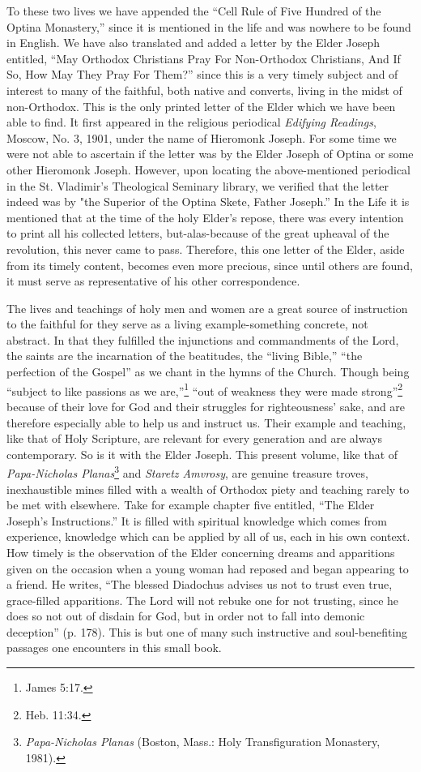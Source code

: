 To these two lives we have appended the “Cell Rule of Five Hundred of the Optina Monastery,” since it is mentioned in the life and was nowhere to be found in English. We have also translated and added a letter by the Elder Joseph entitled, “May Orthodox Christians Pray For Non-Orthodox Christians, And If So, How May They Pray For Them?” since this is a very timely subject and of interest to many of the faithful, both native and converts, living in the midst of non-Orthodox. This is the only printed letter of the Elder which we have been able to find. It first appeared in the religious periodical \textit{Edifying Readings}, Moscow, No. 3, 1901, under the name of Hieromonk Joseph. For some time we were not able to ascertain if the letter was by the Elder Joseph of Optina or some other Hieromonk Joseph. However, upon locating the above-mentioned periodical in the St. Vladimir's Theological Seminary library, we verified that the letter indeed was by "the Superior of the Optina Skete, Father Joseph.” In the Life it is mentioned that at the time of the holy Elder's repose, there was every intention to print all his collected letters, but-alas-because of the great upheaval of the revolution, this never came to pass. Therefore, this one letter of the Elder, aside from its timely content, becomes even more precious, since until others are found, it must serve as representative of his other correspondence.

The lives and teachings of holy men and women are a great source of instruction to the faithful for they serve as a living example-something concrete, not abstract. In that they fulfilled the injunctions and commandments of the Lord, the saints are the incarnation of the beatitudes, the “living Bible,” “the perfection of the Gospel” as we chant in the hymns of the Church. Though being “subject to like passions as we are,''\footnote{James 5:17.} “out of weakness they were made strong''\footnote{Heb. 11:34.} because of their love for God and their struggles for righteousness' sake, and are therefore especially able to help us and instruct us. Their example and teaching, like that of Holy Scripture, are relevant for every generation and are always contemporary. So is it with the Elder Joseph. This present volume, like that of \textit{Papa-Nicholas Planas}\footnote{\textit{Papa-Nicholas Planas} (Boston, Mass.: Holy Transfiguration Monastery, 1981).} and \textit{Staretz Amvrosy}, are genuine treasure troves, inexhaustible mines filled with a wealth of Orthodox piety and teaching rarely to be met with elsewhere. Take for example chapter five entitled, “The Elder Joseph's Instructions.” It is filled with spiritual knowledge which comes from experience, knowledge which can be applied by all of us, each in his own context. How timely is the observation of the Elder concerning dreams and apparitions given on the occasion when a young woman had reposed and began appearing to a friend. He writes, “The blessed Diadochus advises us not to trust even true, grace-filled apparitions. The Lord will not rebuke one for not trusting, since he does so not out of disdain for God, but in order not to fall into demonic deception” (p. 178). This is but one of many such instructive and soul-benefiting passages one encounters in this small book.

